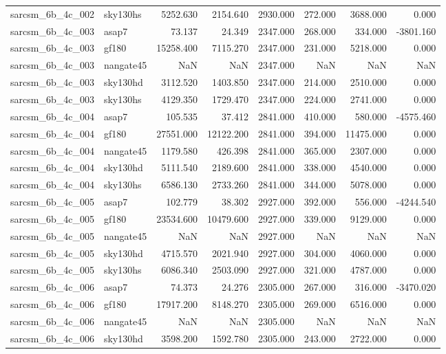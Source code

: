 \begin{tabular}{llrrrrrr}
sarcsm\_6b\_4c\_002 & sky130hs & 5252.630 & 2154.640 & 2930.000 & 272.000 & 3688.000 & 0.000 \\
sarcsm\_6b\_4c\_003 & asap7 & 73.137 & 24.349 & 2347.000 & 268.000 & 334.000 & -3801.160 \\
sarcsm\_6b\_4c\_003 & gf180 & 15258.400 & 7115.270 & 2347.000 & 231.000 & 5218.000 & 0.000 \\
sarcsm\_6b\_4c\_003 & nangate45 & NaN & NaN & 2347.000 & NaN & NaN & NaN \\
sarcsm\_6b\_4c\_003 & sky130hd & 3112.520 & 1403.850 & 2347.000 & 214.000 & 2510.000 & 0.000 \\
sarcsm\_6b\_4c\_003 & sky130hs & 4129.350 & 1729.470 & 2347.000 & 224.000 & 2741.000 & 0.000 \\
sarcsm\_6b\_4c\_004 & asap7 & 105.535 & 37.412 & 2841.000 & 410.000 & 580.000 & -4575.460 \\
sarcsm\_6b\_4c\_004 & gf180 & 27551.000 & 12122.200 & 2841.000 & 394.000 & 11475.000 & 0.000 \\
sarcsm\_6b\_4c\_004 & nangate45 & 1179.580 & 426.398 & 2841.000 & 365.000 & 2307.000 & 0.000 \\
sarcsm\_6b\_4c\_004 & sky130hd & 5111.540 & 2189.600 & 2841.000 & 338.000 & 4540.000 & 0.000 \\
sarcsm\_6b\_4c\_004 & sky130hs & 6586.130 & 2733.260 & 2841.000 & 344.000 & 5078.000 & 0.000 \\
sarcsm\_6b\_4c\_005 & asap7 & 102.779 & 38.302 & 2927.000 & 392.000 & 556.000 & -4244.540 \\
sarcsm\_6b\_4c\_005 & gf180 & 23534.600 & 10479.600 & 2927.000 & 339.000 & 9129.000 & 0.000 \\
sarcsm\_6b\_4c\_005 & nangate45 & NaN & NaN & 2927.000 & NaN & NaN & NaN \\
sarcsm\_6b\_4c\_005 & sky130hd & 4715.570 & 2021.940 & 2927.000 & 304.000 & 4060.000 & 0.000 \\
sarcsm\_6b\_4c\_005 & sky130hs & 6086.340 & 2503.090 & 2927.000 & 321.000 & 4787.000 & 0.000 \\
sarcsm\_6b\_4c\_006 & asap7 & 74.373 & 24.276 & 2305.000 & 267.000 & 316.000 & -3470.020 \\
sarcsm\_6b\_4c\_006 & gf180 & 17917.200 & 8148.270 & 2305.000 & 269.000 & 6516.000 & 0.000 \\
sarcsm\_6b\_4c\_006 & nangate45 & NaN & NaN & 2305.000 & NaN & NaN & NaN \\
sarcsm\_6b\_4c\_006 & sky130hd & 3598.200 & 1592.780 & 2305.000 & 243.000 & 2722.000 & 0.000 \\

\end{tabular}
